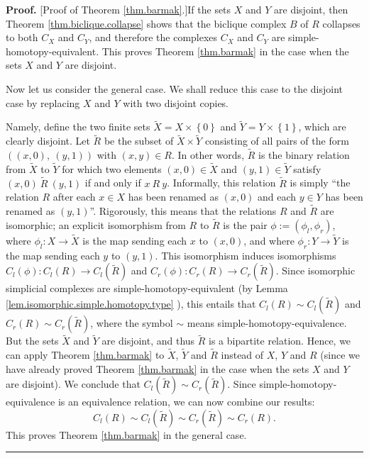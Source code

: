 \documentclass[numbers=enddot,12pt,final,onecolumn,notitlepage]{scrartcl}%
\theoremstyle{definition}
\newenvironment{proof}[1][Proof]{\noindent\textbf{#1.} }{\ \rule{0.5em}{0.5em}}
\begin{document}
\begin{proof}
[Proof of Theorem \ref{thm.barmak}.]If the sets $X$ and $Y$ are disjoint, then
Theorem \ref{thm.biclique.collapse} shows that the biclique complex $B$ of $R$
collapses to both $C_{X}$ and $C_{Y}$, and therefore the complexes $C_{X}$ and
$C_{Y}$ are simple-homotopy-equivalent. This proves Theorem \ref{thm.barmak}
in the case when the sets $X$ and $Y$ are disjoint.

Now let us consider the general case. We shall reduce this case to the
disjoint case by replacing $X$ and $Y$ with two disjoint copies.

Namely, define the two finite sets $\widetilde{X}=X\times\left\{  0\right\}  $
and $\widetilde{Y}=Y\times\left\{  1\right\}  $, which are clearly disjoint.
Let $\widetilde{R}$ be the subset of $\widetilde{X}\times\widetilde{Y}$
consisting of all pairs of the form $\left(  \left(  x,0\right)  ,\ \left(
y,1\right)  \right)  $ with $\left(  x,y\right)  \in R$. In other words,
$\widetilde{R}$ is the binary relation from $\widetilde{X}$ to $\widetilde{Y}$
for which two elements $\left(  x,0\right)  \in\widetilde{X}$ and $\left(
y,1\right)  \in\widetilde{Y}$ satisfy $\left(  x,0\right)  \ \widetilde{R}%
\ \left(  y,1\right)  $ if and only if $x\ R\ y$. Informally, this relation
$\widetilde{R}$ is simply \textquotedblleft the relation $R$ after each $x\in
X$ has been renamed as $\left(  x,0\right)  $ and each $y\in Y$ has been
renamed as $\left(  y,1\right)  $\textquotedblright. Rigorously, this means
that the relations $R$ and $\widetilde{R}$ are isomorphic; an explicit
isomorphism from $R$ to $\widetilde{R}$ is the pair $\phi:=\left(  \phi
_{l},\phi_{r}\right)  $, where $\phi_{l}:X\rightarrow\widetilde{X}$ is the map
sending each $x$ to $\left(  x,0\right)  $, and where $\phi_{r}:Y\rightarrow
\widetilde{Y}$ is the map sending each $y$ to $\left(  y,1\right)  $. This
isomorphism induces isomorphisms $C_{l}(\phi)\colon C_{l}(R)\rightarrow
C_{l}(\widetilde{R})$ and $C_{r}(\phi)\colon C_{r}(R)\rightarrow
C_{r}(\widetilde{R})$. Since isomorphic simplicial complexes are
simple-homotopy-equivalent (by Lemma \ref{lem.isomorphic.simple.homotopy.type}%
), this entails that $C_{l}(R)\sim C_{l}(\widetilde{R})$ and $C_{r}(R)\sim
C_{r}(\widetilde{R})$, where the symbol  $\sim$ means
simple-homotopy-equivalence. But the sets $\widetilde{X}$ and $\widetilde{Y}$
are disjoint, and thus $\widetilde{R}$ is a bipartite relation. Hence, we can
apply Theorem \ref{thm.barmak} to $\widetilde{X}$, $\widetilde{Y}$ and
$\widetilde{R}$ instead of $X$, $Y$ and $R$ (since we have already proved
Theorem \ref{thm.barmak} in the case when the sets $X$ and $Y$ are disjoint).
We conclude that $C_{l}(\widetilde{R})\sim C_{r}(\widetilde{R})$. Since
simple-homotopy-equivalence is an equivalence relation, we can now combine our
results:%
\[
C_{l}\left(  R\right)  \sim C_{l}(\widetilde{R})\sim C_{r}(\widetilde{R})\sim
C_{r}\left(  R\right)  .
\]
This proves Theorem \ref{thm.barmak} in the general case.
\end{proof}
\end{document}
